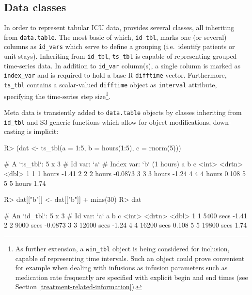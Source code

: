 \documentclass[
  notitle]{jss}
\begin{document}
\hypertarget{data-classes}{%
\subsection{Data classes}\label{data-classes}}

In order to represent tabular ICU data,  provides several
classes, all inheriting from \texttt{data.table}. The most basic of
which, \texttt{id\_tbl}, marks one (or several) columns as
\texttt{id\_vars} which serve to define a grouping (i.e.~identify
patients or unit stays). Inheriting from \texttt{id\_tbl},
\texttt{ts\_tbl} is capable of representing grouped time-series data. In
addition to \texttt{id\_var} column(s), a single column is marked as
\texttt{index\_var} and is required to hold a base R \texttt{difftime}
vector. Furthermore, \texttt{ts\_tbl} contains a scalar-valued
\texttt{difftime} object as \texttt{interval} attribute, specifying the
time-series step size\footnote{As further extension, a \texttt{win\_tbl}
  object is being considered for inclusion, capable of representing time
  intervals. Such an object could prove convenient for example when
  dealing with infusions as infusion parameters such as medication rate
  frequently are specified with explicit begin and end times (see
  Section \ref{treatment-related-information}).}.

Meta data is transiently added to \texttt{data.table} objects by classes
inheriting from \texttt{id\_tbl} and S3 generic functions which allow
for object modifications, down-casting is implicit:

\begin{CodeChunk}
\begin{CodeInput}
R> (dat <- ts_tbl(a = 1:5, b = hours(1:5), c = rnorm(5)))
\end{CodeInput}
\begin{CodeOutput}
# A `ts_tbl`: 5 x 3
# Id var:     `a`
# Index var:  `b` (1 hours)
      a b             c
  <int> <drtn>    <dbl>
1     1 1 hours -1.41
2     2 2 hours -0.0873
3     3 3 hours -1.24
4     4 4 hours  0.108
5     5 5 hours  1.74
\end{CodeOutput}
\begin{CodeInput}
R> dat[["b"]] <- dat[["b"]] + mins(30)
R> dat
\end{CodeInput}
\begin{CodeOutput}
# An `id_tbl`: 5 x 3
# Id var:      `a`
      a b                c
  <int> <drtn>       <dbl>
1     1  5400 secs -1.41
2     2  9000 secs -0.0873
3     3 12600 secs -1.24
4     4 16200 secs  0.108
5     5 19800 secs  1.74
\end{CodeOutput}
\end{CodeChunk}
\end{document}
